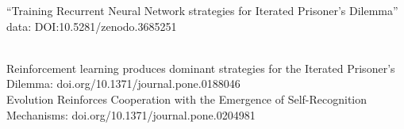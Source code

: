 \documentclass{beamer}
\begin{document}
\begin{frame}
    \begin{center}
    
    \end{center}
\end{frame}


\begin{frame}
    \begin{center}
    
    \end{center}
\end{frame}

\begin{frame}
    \begin{center}
    
    \end{center}
\end{frame}

\begin{frame}
    \begin{center}
    
    \end{center}
\end{frame}

\begin{frame}
    \begin{center}
        \large{``Training Recurrent Neural Network strategies for Iterated Prisoner's Dilemma''} \\ \vspace{.5cm}
        \footnotesize{data: DOI:10.5281/zenodo.3685251}
    \end{center}
\end{frame}
\begin{frame}
    \begin{center}
     \\ \vspace{.5cm}
    \pause
    \small{Reinforcement learning produces dominant strategies for the Iterated Prisoner's Dilemma: doi.org/10.1371/journal.pone.0188046} \\ \vspace{.5cm}
    \small{Evolution Reinforces Cooperation with the Emergence of Self-Recognition Mechanisms: doi.org/10.1371/journal.pone.0204981}
    \end{center}
\end{frame}
\end{document}
